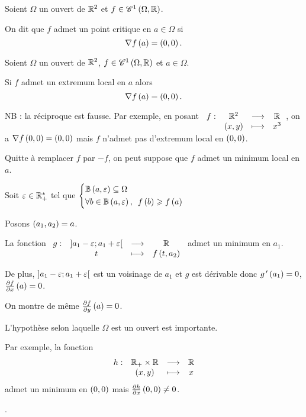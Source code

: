 \begin{defi}
Soient \(\Omega\) un ouvert de \(\mathbb{R}^2\) et \(f\in\mathscr{C}^{1}\left(\Omega,\mathbb{R}\right)\).

On dit que \(f\) admet un point critique en \(a\in\Omega\) si \[\nabla f\left(a\right)=\left(0,0\right).\]
\end{defi}

\begin{theo}
Soient \(\Omega\) un ouvert de \(\mathbb{R}^2\), \(f\in\mathscr{C}^{1}\left(\Omega,\mathbb{R}\right)\) et \(a\in\Omega\).

Si \(f\) admet un extremum local en \(a\) alors \[\nabla f\left(a\right)=\left(0,0\right).\]

NB : la réciproque est fausse. Par exemple, en posant \(\begin{array}[t]{cccc}f : & \mathbb{R}^2 & \longrightarrow & \mathbb{R} \\ & \left(x,y\right) & \longmapsto & x^3\end{array}\), on a \(\nabla f\left(0,0\right)=\left(0,0\right)\) mais \(f\) n'admet pas d'extremum local en \(\left(0,0\right)\).
\end{theo}

\begin{dem}
Quitte à remplacer \(f\) par \(-f\), on peut suppose que \(f\) admet un minimum local en \(a\).

Soit \(\varepsilon\in\mathbb{R}_+^*\) tel que \(\begin{dcases}
\bouleo{a}{\epsilon}\subset\Omega \\
\quantifs{\forall b\in\bouleo{a}{\epsilon}}f\paren{b}\geq f\paren{a}
\end{dcases}\)

Posons \(\left(a_1,a_2\right)=a\).

La fonction \(\begin{array}[t]{cccc}g : & \left]a_1-\varepsilon;a_1+\varepsilon\right[ & \longrightarrow & \mathbb{R} \\ & t & \longmapsto & f\left(t,a_2\right)\end{array}\) admet un minimum en \(a_1\).

De plus, \(\left]a_1-\varepsilon;a_1+\varepsilon\right[\) est un voisinage de \(a_1\) et \(g\) est dérivable donc \(g^{\,\prime}\left(a_1\right)=0\), \cad \(\pdv{f}{x}\left(a\right)=0\).

On montre de même \(\pdv{f}{y}\left(a\right)=0\).
\end{dem}

\begin{rem}
L'hypothèse selon laquelle \(\Omega\) est un ouvert est importante.

Par exemple, la fonction \[\begin{array}[t]{cccc}h : & \mathbb{R}_+\times\mathbb{R} & \longrightarrow & \mathbb{R} \\ & \left(x,y\right) & \longmapsto & x\end{array}\] admet un minimum en \(\left(0,0\right)\) mais \(\pdv{h}{x}\left(0,0\right)\not=0\).
\end{rem}

\begin{ex}
\Cf {}.
\end{ex}